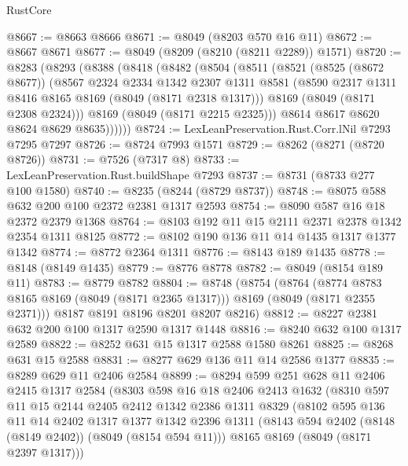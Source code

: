\begin{lexlean}{RustCore}
\begin{coremodule}
@8667 := @8663 @8666
@8671 := @8049 (@8203 @570 @16 @11)
@8672 := @8667 @8671
@8677 := @8049 (@8209 (@8210 (@8211 @2289)) @1571)
@8720 := @8283
    (@8293
      (@8388
        (@8418
          (@8482
            (@8504
              (@8511
                (@8521
                  (@8525 (@8672 @8677))
                  (@8567
                    @2324
                    @2334
                    @1342
                    @2307
                    @1311
                    @8581
                    (@8590 @2317 @1311 @8416 @8165 @8169 (@8049 (@8171 @2318 @1317)))
                    @8169
                    (@8049 (@8171 @2308 @2324)))
                  @8169
                  (@8049 (@8171 @2215 @2325)))
                @8614
                @8617
                @8620
                @8624
                @8629
                @8635))))))
@8724 := LexLeanPreservation.Rust.Corr.lNil @7293 @7295 @7297
@8726 := @8724 @7993 @1571
@8729 := @8262 (@8271 (@8720 @8726))
@8731 := @7526 (@7317 @8)
@8733 := LexLeanPreservation.Rust.buildShape @7293
@8737 := @8731 (@8733 @277 @100 @1580)
@8740 := @8235 (@8244 (@8729 @8737))
@8748 := @8075 @588 @632 @200 @100 @2372 @2381 @1317 @2593
@8754 := @8090 @587 @16 @18 @2372 @2379 @1368
@8764 := @8103 @192 @11 @15 @2111 @2371 @2378 @1342 @2354 @1311 @8125
@8772 := @8102 @190 @136 @11 @14 @1435 @1317 @1377 @1342
@8774 := @8772 @2364 @1311
@8776 := @8143 @189 @1435
@8778 := @8148 (@8149 @1435)
@8779 := @8776 @8778
@8782 := @8049 (@8154 @189 @11)
@8783 := @8779 @8782
@8804 := @8748
    (@8754
      (@8764
        (@8774 @8783 @8165 @8169 (@8049 (@8171 @2365 @1317)))
        @8169
        (@8049 (@8171 @2355 @2371)))
      @8187
      @8191
      @8196
      @8201
      @8207
      @8216)
@8812 := @8227 @2381 @632 @200 @100 @1317 @2590 @1317 @1448
@8816 := @8240 @632 @100 @1317 @2589
@8822 := @8252 @631 @15 @1317 @2588 @1580 @8261
@8825 := @8268 @631 @15 @2588
@8831 := @8277 @629 @136 @11 @14 @2586 @1377
@8835 := @8289 @629 @11 @2406 @2584
@8899 := @8294
    @599
    @251
    @628
    @11
    @2406
    @2415
    @1317
    @2584
    (@8303
      @598
      @16
      @18
      @2406
      @2413
      @1632
      (@8310
        @597
        @11
        @15
        @2144
        @2405
        @2412
        @1342
        @2386
        @1311
        @8329
        (@8102
          @595
          @136
          @11
          @14
          @2402
          @1317
          @1377
          @1342
          @2396
          @1311
          (@8143 @594 @2402 (@8148 (@8149 @2402)) (@8049 (@8154 @594 @11)))
          @8165
          @8169
          (@8049 (@8171 @2397 @1317)))

\end{coremodule}
\end{lexlean}
